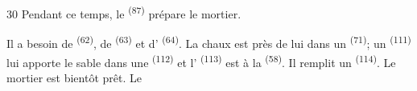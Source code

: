 \begin{VUpage}[32]{30}
\VUblancAlinea
Pendant ce temps, le  \textsuperscript{(87)} prépare\nl
le mortier.

\VUblancAlinea
Il a besoin de  \textsuperscript{(62)}, de  \textsuperscript{(63)} et d' \textsuperscript{(64)}.\nl
La chaux est près de lui dans un  \textsuperscript{(71)}; un \cc
{} \textsuperscript{(111)} lui apporte le sable dans une  \textsuperscript{(112)}\nl
et l' \textsuperscript{(113)} est à la  \textsuperscript{(58)}. Il remplit un\nl
{} \textsuperscript{(114)}. Le mortier est bientôt prêt. Le \cc
\parplein
\end{VUpage}

